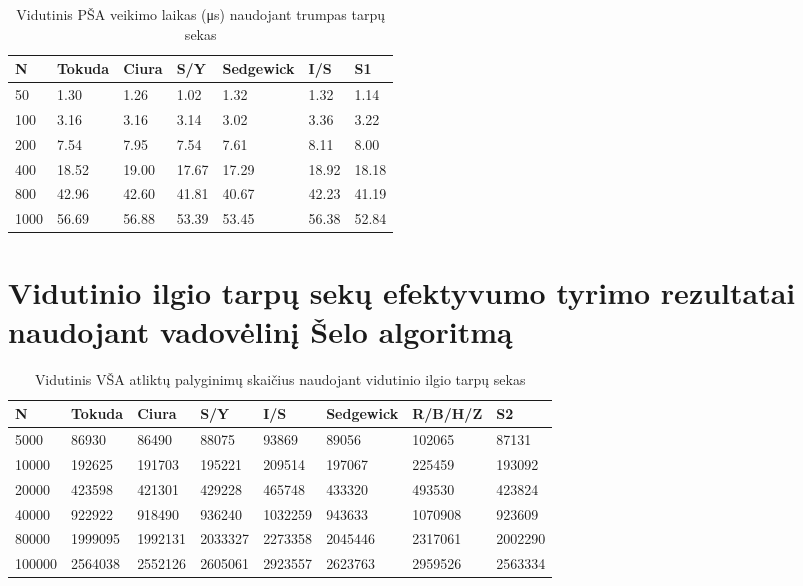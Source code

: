 \documentclass{VUMIFInfKursinis}
\begin{document}
\begin{table}[H]
  \caption{Vidutinis PŠA veikimo laikas (μs) naudojant trumpas tarpų sekas}
  \label{iss_small_runtimes}
  \begin{tabular}{|l|l|l|l|l|l|l|}
  \hline
  N    & Tokuda & Ciura & S/Y   & Sedgewick & I/S   & S1    \\ \hline
  50   & 1.30   & 1.26  & 1.02  & 1.32      & 1.32  & 1.14  \\ \hline
  100  & 3.16   & 3.16  & 3.14  & 3.02      & 3.36  & 3.22  \\ \hline
  200  & 7.54   & 7.95  & 7.54  & 7.61      & 8.11  & 8.00  \\ \hline
  400  & 18.52  & 19.00 & 17.67 & 17.29     & 18.92 & 18.18 \\ \hline
  800  & 42.96  & 42.60 & 41.81 & 40.67     & 42.23 & 41.19 \\ \hline
  1000 & 56.69  & 56.88 & 53.39 & 53.45     & 56.38 & 52.84 \\ \hline
  \end{tabular}
  \end{table}

\section{Vidutinio ilgio tarpų sekų efektyvumo tyrimo rezultatai naudojant vadovėlinį Šelo algoritmą}

\begin{table}[H]
  \caption{Vidutinis VŠA atliktų palyginimų skaičius naudojant vidutinio ilgio tarpų sekas}
  \label{tss_medium_comparisons}
  \begin{tabular}{|l|l|l|l|l|l|l|l|}
  \hline
  N      & Tokuda  & Ciura   & S/Y     & I/S     & Sedgewick & R/B/H/Z & S2     \\ \hline
  5000   & 86930   & 86490   & 88075   & 93869   & 89056     & 102065  & 87131   \\ \hline
  10000  & 192625  & 191703  & 195221  & 209514  & 197067    & 225459  & 193092  \\ \hline
  20000  & 423598  & 421301  & 429228  & 465748  & 433320    & 493530  & 423824  \\ \hline
  40000  & 922922  & 918490  & 936240  & 1032259 & 943633    & 1070908 & 923609  \\ \hline
  80000  & 1999095 & 1992131 & 2033327 & 2273358 & 2045446   & 2317061 & 2002290 \\ \hline
  100000 & 2564038 & 2552126 & 2605061 & 2923557 & 2623763   & 2959526 & 2563334 \\ \hline
  \end{tabular}
\end{table}
\end{document}
